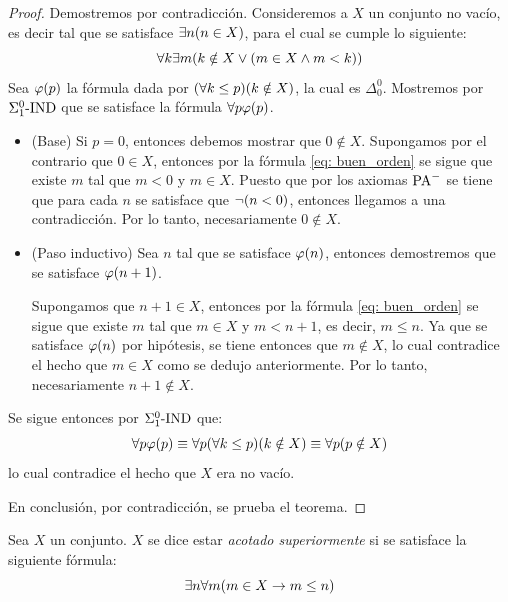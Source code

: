 \begin{proof}
	Demostremos por contradicción. Consideremos a $X$ un conjunto no vacío, es decir tal que se satisface $\exists n\pa*{n\in X}$, para el cual se cumple lo siguiente:
	\begin{equation}
		\label{eq: buen_orden}
		\forall k\exists m\pa*{k\notin X\lor\pa*{m\in X\land m < k}}
	\end{equation}
	Sea $\varphi\pa*{p}$ la fórmula dada por $\pa*{\forall k\leq p}\pa*{k\notin X}$, la cual es $\Delta_{0}^{0}$. Mostremos por $\Sigma_{1}^{0}\text{-}\mathrm{IND}$ que se satisface la fórmula $\forall p\varphi\pa*{p}$.

	\begin{itemize}
		\item (Base) Si $p = 0$, entonces debemos mostrar que $0\notin X$. Supongamos por el contrario que $0\in X$, entonces por la fórmula \eqref{eq: buen_orden} se sigue que existe $m$ tal que $m < 0$ y $m\in X$. Puesto que por los axiomas $\mathrm{PA}^{-}$ se tiene que para cada $n$ se satisface que $\neg\pa*{n < 0}$, entonces llegamos a una contradicción. Por lo tanto, necesariamente $0\notin X$.

		\item (Paso inductivo) Sea $n$ tal que se satisface $\varphi\pa*{n}$, entonces demostremos que se satisface $\varphi\pa*{n + 1}$.

		Supongamos que $n + 1\in X$, entonces por la fórmula \eqref{eq: buen_orden} se sigue que existe $m$ tal que $m\in X$ y $m < n + 1$, es decir, $m\leq n$. Ya que se satisface $\varphi\pa*{n}$ por hipótesis, se tiene entonces que $m\notin X$, lo cual contradice el hecho que $m\in X$ como se dedujo anteriormente. Por lo tanto, necesariamente $n + 1\notin X$.
	\end{itemize}

	Se sigue entonces por $\Sigma_{1}^{0}\text{-}\mathrm{IND}$ que:
	\[
		\forall p\varphi\pa*{p}\equiv\forall p\pa*{\forall k\leq p}\pa*{k\notin X}\equiv\forall p\pa*{p\notin X}
	\]
	lo cual contradice el hecho que $X$ era no vacío.

	En conclusión, por contradicción, se prueba el teorema.
\end{proof}

\begin{definition}
	Sea $X$ un conjunto. $X$ se dice estar \emph{acotado superiormente} si se satisface la siguiente fórmula:
	\[
		\exists n\forall m\pa*{m\in X\to m\leq n}
	\]
\end{definition}


